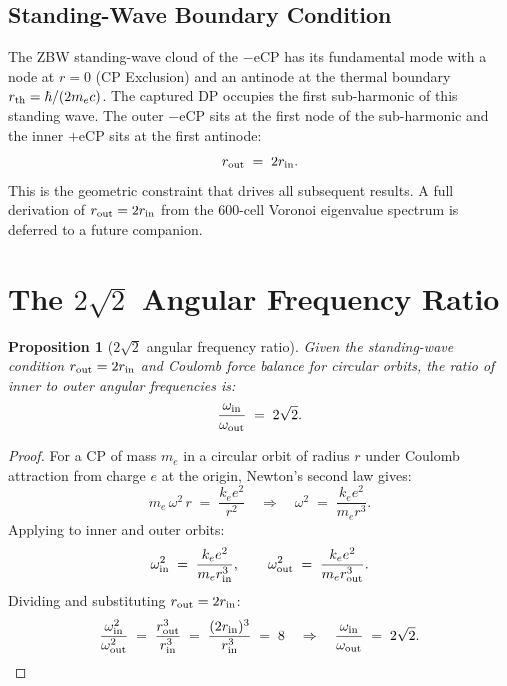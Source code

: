 \documentclass[12pt]{article}
\newtheorem{proposition}[theorem]{Proposition}
\newcommand{\rin}{r_{\rm in}}
\newcommand{\rout}{r_{\rm out}}
\newcommand{\oin}{\omega_{\rm in}}
\newcommand{\oout}{\omega_{\rm out}}
\begin{document}
\subsection{Standing-Wave Boundary Condition}

The ZBW standing-wave cloud of the $-$eCP has its fundamental mode
with a node at $r = 0$ (CP Exclusion) and an antinode at the thermal
boundary $r_{\rm th} = \hbar/(2m_e c)$.  The captured DP occupies the
first sub-harmonic of this standing wave.  The outer $-$eCP sits at
the first node of the sub-harmonic and the inner $+$eCP sits at the
first antinode:
\begin{equation}
  \rout \;=\; 2\rin.
  \label{eq:rout}
\end{equation}
This is the geometric constraint that drives all subsequent results.  A
full derivation of $\rout = 2\rin$ from the 600-cell Voronoi eigenvalue
spectrum is deferred to a future companion.

\section{The $2\sqrt{2}$ Angular Frequency Ratio}
\label{sec:ratio}

\begin{proposition}[$2\sqrt{2}$ angular frequency ratio]
\label{prop:ratio}
Given the standing-wave condition $\rout = 2\rin$ and Coulomb force
balance for circular orbits, the ratio of inner to outer angular
frequencies is:
\begin{equation}
  \frac{\oin}{\oout} \;=\; 2\sqrt{2}.
  \label{eq:ratio}
\end{equation}
\end{proposition}

\begin{proof}
For a CP of mass $m_e$ in a circular orbit of radius $r$ under
Coulomb attraction from charge $e$ at the origin, Newton's second law
gives:
\begin{equation}
  m_e\,\omega^2\,r \;=\; \frac{k_e e^2}{r^2}
  \quad\Rightarrow\quad
  \omega^2 \;=\; \frac{k_e e^2}{m_e r^3}.
  \label{eq:force_balance}
\end{equation}
Applying to inner and outer orbits:
\begin{equation}
  \oin^2 \;=\; \frac{k_e e^2}{m_e \rin^3}, \qquad
  \oout^2 \;=\; \frac{k_e e^2}{m_e \rout^3}.
  \label{eq:both_omegas}
\end{equation}
Dividing and substituting $\rout = 2\rin$:
\begin{equation}
  \frac{\oin^2}{\oout^2}
  \;=\; \frac{\rout^3}{\rin^3}
  \;=\; \frac{(2\rin)^3}{\rin^3}
  \;=\; 8
  \quad\Rightarrow\quad
  \frac{\oin}{\oout} \;=\; 2\sqrt{2}.
  \label{eq:ratio_proof}
\end{equation}
\end{proof}
\end{document}
